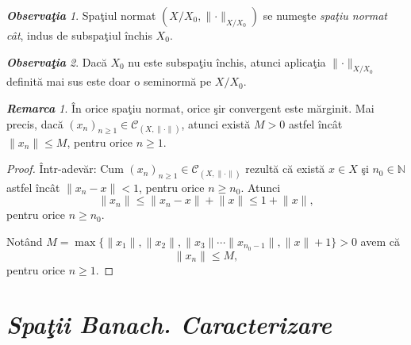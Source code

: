 \documentclass[ a4paper, 12pt]{report}
\theoremstyle{definition}
\theoremstyle{remark}
\newtheorem{remarc}{\bf Remarca}[section]
\newtheorem{obs}{\bf Observa\c tia }[section]
\numberwithin{equation}{section}
\begin{document}
\begin{obs}
Spa\c tiul normat $\left(  X/X_0, \lVert \cdot \rVert_{X/X_0} \right)$ se nume\c ste \emph{spa\c tiu normat c\^at}, indus de subspa\c tiul \^inchis $X_0$.
\end{obs}
\begin{obs}
Dac\u a $X_0$ nu este subspa\c tiu \^inchis, atunci aplica\c tia $\lVert \cdot \rVert_{X/X_0}$ definit\u a mai sus este doar o seminorm\u a pe $X/X_0.$
\end{obs}
\begin{remarc}
\^In orice spa\c tiu normat, orice \c sir convergent este m\u arginit. Mai precis,  dac\u a $(x_n)_{n \geq 1} \in \mathcal{C}_{(X, \lVert \cdot \rVert)}$,  atunci exist\u a $ M>0$ astfel \^inc\^at $\lVert x_n \rVert \leq M$, pentru orice $ n \geq 1.$
\end{remarc}

\begin{proof}
\^Intr-adev\u ar: Cum $(x_n)_{n \geq 1} \in \mathcal{C}_{(X, \lVert \cdot \rVert)}$ rezult\u a c\u a exist\u a  $x \in X$ \c si $n_0 \in \mathbb{N}$ astfel \^inc\^at $\lVert x_n - x \rVert <1$, pentru orice  $n \geq n_0$. Atunci
$$ \lVert x_n \rVert \leq \lVert x_n - x \rVert +  \lVert x \rVert \leq 1 +  \lVert x \rVert,$$ pentru orice $ n \geq n_0.$

Not\^and $M = \max\{ \lVert x_1 \rVert, \lVert x_2 \rVert, \lVert x_3 \rVert \cdots \lVert x_{n_{0} -1} \rVert, \lVert x \rVert +1 \} >0$ avem c\u a
 $$\lVert x_n \rVert \leq M,$$ pentru orice $ n \geq 1.$
\end{proof}







\section{\textit{Spa\c tii Banach. Caracterizare}}
\end{document}
